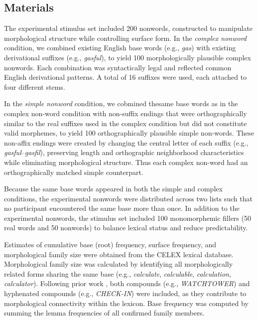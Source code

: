 \documentclass[utf8]{FrontiersinHarvard} %
\begin{document}
\subsection{Materials}

The experimental stimulus set included 200 nonwords, constructed to manipulate morphological structure while controlling surface form. In the \textit{complex nonword} condition, we combined existing English base words (e.g., \textit{gas}) with existing derivational suffixes (e.g., \textit{gasful}), to yield 100 morphologically plausible complex nonwords. Each combination was syntactically legal and reflected common English derivational patterns. A total of 16 suffixes were used, each attached to four different stems.

In the \textit{simple nonword} condition, we cobmined thesame base words as in the complex non-word condition  with non-suffix endings that were orthographically similar to the real suffixes used in the complex condition but did not constitute valid morphemes, to yield 100 orthographically plausible simple non-words. These non-affix endings were created by changing the central letter of each suffix (e.g., \textit{gasful}–\textit{gasfil}), preserving length and orthographic neighborhood characteristics while eliminating morphological structure.  Thus each complex non-word had an orthographically matched simple counterpart.

Because the same base words appeared in both the simple and complex conditions, the experimental nonwords were distributed across two lists such that no participant encountered the same base more than once. In addition to the experimental nonwords, the stimulus set included 100 monomorphemic fillers (50 real words and 50 nonwords) to balance lexical status and reduce predictability.

Estimates of cumulative base (root) frequency, surface frequency, and morphological family size were obtained from the CELEX lexical database. Morphological family size was calculated by identifying all morphologically related forms sharing the same base (e.g., \textit{calculate}, \textit{calculable}, \textit{calculation}, \textit{calculator}). Following prior work \citep[e.g.,][]{deJong2001, deJong2003}, both compounds (e.g., \textit{WATCHTOWER}) and hyphenated compounds (e.g., \textit{CHECK-IN}) were included, as they contribute to morphological connectivity within the lexicon. Base frequency was computed by summing the lemma frequencies of all confirmed family members.
\end{document}
